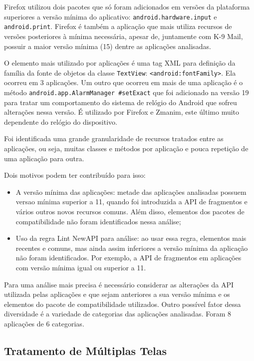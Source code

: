 Firefox utilizou dois pacotes que só foram adicionados em versões da plataforma
superiores a versão mínima do aplicativo: \texttt{android.hardware.input} e
\texttt{android.print}. Firefox é também a aplicação que mais utiliza recursos
de versões posteriores à mínima necessária, apesar de, juntamente com K-9 Mail,
possuir a maior versão mínima (15) dentre as aplicações analisadas.

O elemento mais utilizado por aplicações é uma tag XML para definição da família
da fonte de objetos da classe \texttt{TextView}: \texttt{<android:fontFamily>}.
Ela ocorreu em 3 aplicações. Um outro que ocorreu em mais de uma aplicação é o
método \texttt{android.app.AlarmManager \#setExact} que foi adicionado na versão
19 para tratar um comportamento do sistema de relógio do Android que sofreu
alterações nessa versão. É utilizado por Firefox e Zmanim, este último muito
dependente do relógio do dispositivo.

Foi identificada uma grande granularidade de recursos tratados entre as aplicações,
ou seja, muitas classes e métodos por aplicação e pouca repetição de uma aplicação
para outra.
 
Dois motivos podem ter contribuído para isso:
\begin{itemize}
    \item A versão mínima das aplicações: metade das aplicações analisadas possuem
        versao mínima superior a 11, quando foi introduzida a API de fragmentos e
        vários outros novos recursos comuns. Além disso, elementos dos pacotes
        de compatibilidade não foram identificados nessa análise;
   \item Uso da regra Lint NewAPI para análise: ao usar essa regra, elementos
        mais recentes e comuns, mas ainda assim inferiores a versão mínima da
        aplicação não foram identificados. Por exemplo, a API de fragmentos em
        aplicações com versão mínima igual ou superior a 11.
\end{itemize}


Para uma análise mais precisa é necessário considerar as alterações da API
utilizada pelas aplicações e que sejam anteriores a sua versão mínima e os
elementos do pacote de compatibilidade utilizados. Outro possível fator dessa
diversidade é a variedade de categorias das aplicações analisadas. Foram 8
aplicações de 6 categorias.

\subsection{Tratamento de Múltiplas Telas}
\label{sec:multiplas_telas}

